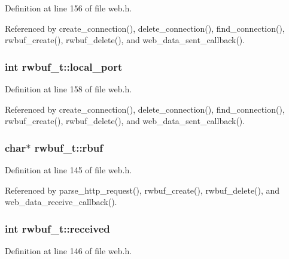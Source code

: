 Definition at line 156 of file web.\-h.



Referenced by create\-\_\-connection(), delete\-\_\-connection(), find\-\_\-connection(), rwbuf\-\_\-create(), rwbuf\-\_\-delete(), and web\-\_\-data\-\_\-sent\-\_\-callback().

\hypertarget{structrwbuf__t_aac758cef289d022f4eb81d4c4fac7f04}{
\subsubsection[{local\-\_\-port}]{\setlength{\rightskip}{0pt plus 5cm}int rwbuf\-\_\-t\-::local\-\_\-port}}\label{structrwbuf__t_aac758cef289d022f4eb81d4c4fac7f04}


Definition at line 158 of file web.\-h.



Referenced by create\-\_\-connection(), delete\-\_\-connection(), find\-\_\-connection(), rwbuf\-\_\-create(), rwbuf\-\_\-delete(), and web\-\_\-data\-\_\-sent\-\_\-callback().

\hypertarget{structrwbuf__t_afd83372241273849c9395d587b146021}{
\subsubsection[{rbuf}]{\setlength{\rightskip}{0pt plus 5cm}char$\ast$ rwbuf\-\_\-t\-::rbuf}}\label{structrwbuf__t_afd83372241273849c9395d587b146021}


Definition at line 145 of file web.\-h.



Referenced by parse\-\_\-http\-\_\-request(), rwbuf\-\_\-create(), rwbuf\-\_\-delete(), and web\-\_\-data\-\_\-receive\-\_\-callback().

\hypertarget{structrwbuf__t_ac76412a0fbf9dc009ae3f8bb20660883}{
\subsubsection[{received}]{\setlength{\rightskip}{0pt plus 5cm}int rwbuf\-\_\-t\-::received}}\label{structrwbuf__t_ac76412a0fbf9dc009ae3f8bb20660883}


Definition at line 146 of file web.\-h.



